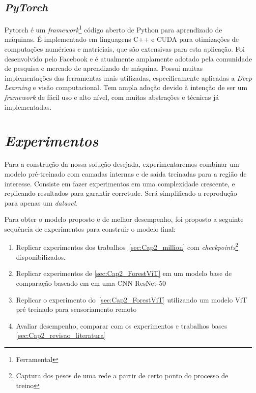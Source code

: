 \subsection{\textit{PyTorch}}\label{sec:Cap2_PyTorch}
Pytorch é um \textit{framework}\footnote{Ferramental} código aberto de Python para aprendizado de máquinas. É implementado em linguagens C++ e CUDA para otimizações de computações numéricas e matriciais, que são extensivas para esta aplicação.
Foi desenvolvido pelo Facebook e é atualmente amplamente adotado pela comunidade de pesquisa e mercado de aprendizado de máquina. Possui muitas implementações das ferramentas mais utilizadas, especificamente aplicadas a \textit{Deep Learning} e visão computacional. Tem ampla adoção devido à intenção de ser um \textit{framework} de fácil uso e alto nível, com muitas abstrações e técnicas já implementadas.




\section{\textit{Experimentos}}\label{sec:Cap3_Experimentos}

Para a construção da nossa solução desejada, experimentaremos combinar um modelo pré-treinado com camadas internas e de saída treinadas para a região de interesse.
Consiste em fazer experimentos em uma complexidade crescente, e replicando resultados para garantir corretude. Será simplificado a reprodução para apenas um \textit{dataset}.


Para obter o modelo proposto e de melhor desempenho, foi proposto a seguinte sequência de experimentos para construir o modelo final:

\begin{enumerate}
\item  Replicar experimentos dos trabalhos~\ref{sec:Cap2_million} com \textit{checkpoints}\footnote{Captura dos pesos de uma rede a partir de certo ponto do processo de treino} disponibilizados. 
\item  Replicar experimentos de \ref{sec:Cap2_ForestViT} em um modelo base de comparação baseado em em uma CNN ResNet-50
\item  Replicar o experimento do~\ref{sec:Cap2_ForestViT} utilizando um modelo ViT pré treinado para sensoriamento remoto
\item Avaliar desempenho, comparar com os experimentos e trabalhos bases \ref{sec:Cap2_revisao_literatura}
\end{enumerate}


